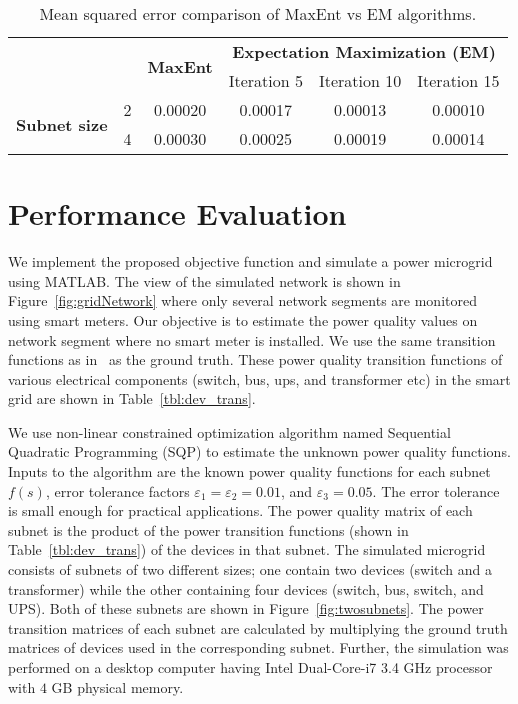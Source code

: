 \begin{table}[!p]
\renewcommand{\tabcolsep}{0.2 cm}
\renewcommand*{\arraystretch}{2}
\centering \caption{Mean squared error comparison of MaxEnt vs EM algorithms.}
\begin{tabular}{|c|c|c|c|c|c|}
 \hline \multicolumn{2}{|c|}{\multirow{2}{*}{}} & \multirow{2}{*}{\textbf{MaxEnt}} & \multicolumn{3}{c|}{\textbf{Expectation Maximization (EM)}}\\
\cline{4-6}
\multicolumn{2}{|c|}{} & & Iteration 5 & Iteration 10 & Iteration 15\\
\hline
\multirow{2}{*}{\textbf{Subnet size}} & 2 & 0.00020 & 0.00017 & 0.00013 & 0.00010\\
\cline{2-6}
& 4 & 0.00030 & 0.00025 & 0.00019 & 0.00014\\
\hline
\end{tabular}
\vspace{4cm}
\label{tbl:eval_mse}
\end{table}

\section{Performance Evaluation}
\label{sec:evaluation}
We implement the proposed objective function and simulate a power microgrid using MATLAB. The view of the simulated network is shown in Figure~\ref{fig:gridNetwork} where only several network segments are monitored using smart meters. Our objective is to estimate the power quality values on network segment where no smart meter is installed. We use the same transition functions as in~\cite{catherine_pri} as the ground truth. These power quality transition functions of various electrical components (switch, bus, ups, and transformer etc) in the smart grid are shown in Table~\ref{tbl:dev_trans}.

We use non-linear constrained optimization algorithm named Sequential Quadratic Programming (SQP) to estimate the unknown power quality functions. Inputs to the algorithm are the known power quality functions for each subnet $f(s)$, error tolerance factors $\varepsilon_1 = \varepsilon_2 = 0.01$, and $ \varepsilon_3 = 0.05$. The error tolerance is small enough for practical applications. The power quality matrix of each subnet is the product of the power transition functions (shown in Table~\ref{tbl:dev_trans}) of the devices in that subnet. The simulated microgrid consists of subnets of two different sizes; one contain two devices (switch and a transformer) while the other containing four devices (switch, bus, switch, and UPS). Both of these subnets are shown in Figure~\ref{fig:twosubnets}. The power transition matrices of each subnet are calculated by multiplying the ground truth matrices of devices used in the corresponding subnet. Further, the simulation was performed on a desktop computer having Intel Dual-Core-i7 3.4 GHz processor with $4$ GB physical memory.

